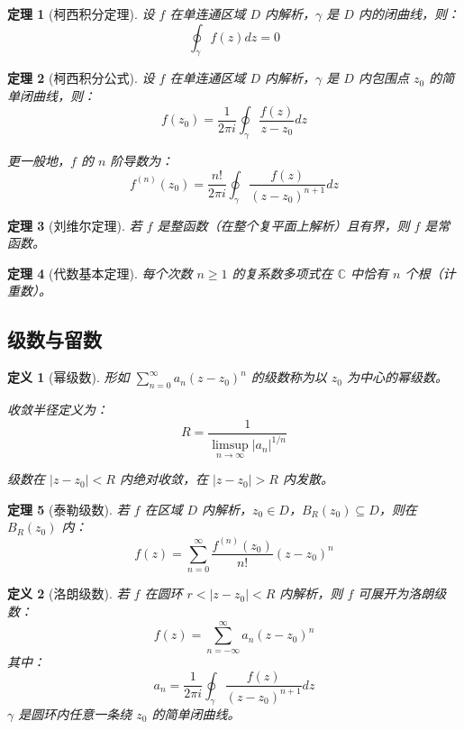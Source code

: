 \documentclass[12pt]{article}
\newtheorem{theorem}{定理}[section]
\newtheorem{definition}{定义}[section]
\begin{document}
\begin{theorem}[柯西积分定理]
设 $f$ 在单连通区域 $D$ 内解析，$\gamma$ 是 $D$ 内的闭曲线，则：
$$\oint_\gamma f(z) dz = 0$$
\end{theorem}

\begin{theorem}[柯西积分公式]
设 $f$ 在单连通区域 $D$ 内解析，$\gamma$ 是 $D$ 内包围点 $z_0$ 的简单闭曲线，则：
$$f(z_0) = \frac{1}{2\pi i} \oint_\gamma \frac{f(z)}{z - z_0} dz$$

更一般地，$f$ 的 $n$ 阶导数为：
$$f^{(n)}(z_0) = \frac{n!}{2\pi i} \oint_\gamma \frac{f(z)}{(z - z_0)^{n+1}} dz$$
\end{theorem}

\begin{theorem}[刘维尔定理]
若 $f$ 是整函数（在整个复平面上解析）且有界，则 $f$ 是常函数。
\end{theorem}

\begin{theorem}[代数基本定理]
每个次数 $n \geq 1$ 的复系数多项式在 $\mathbb{C}$ 中恰有 $n$ 个根（计重数）。
\end{theorem}

\subsection{级数与留数}

\begin{definition}[幂级数]
形如 $\sum_{n=0}^{\infty} a_n (z - z_0)^n$ 的级数称为以 $z_0$ 为中心的幂级数。

收敛半径定义为：
$$R = \frac{1}{\limsup_{n \to \infty} |a_n|^{1/n}}$$

级数在 $|z - z_0| < R$ 内绝对收敛，在 $|z - z_0| > R$ 内发散。
\end{definition}

\begin{theorem}[泰勒级数]
若 $f$ 在区域 $D$ 内解析，$z_0 \in D$，$B_R(z_0) \subseteq D$，则在 $B_R(z_0)$ 内：
$$f(z) = \sum_{n=0}^{\infty} \frac{f^{(n)}(z_0)}{n!} (z - z_0)^n$$
\end{theorem}

\begin{definition}[洛朗级数]
若 $f$ 在圆环 $r < |z - z_0| < R$ 内解析，则 $f$ 可展开为洛朗级数：
$$f(z) = \sum_{n=-\infty}^{\infty} a_n (z - z_0)^n$$
其中：
$$a_n = \frac{1}{2\pi i} \oint_\gamma \frac{f(z)}{(z - z_0)^{n+1}} dz$$
$\gamma$ 是圆环内任意一条绕 $z_0$ 的简单闭曲线。
\end{definition}
\end{document}
